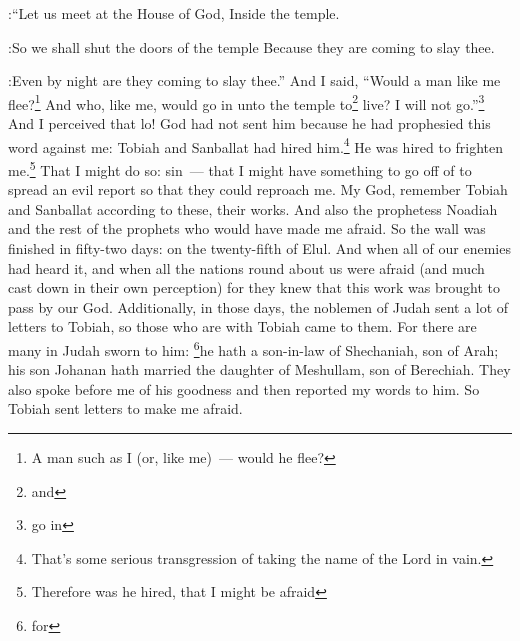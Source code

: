 \begin{enumerate}
:``Let us meet at the House of God, Inside the temple.

:So we shall shut the doors of the temple Because they are coming to slay thee.

:Even by night are they coming to slay thee.''%
     And I said, ``Would a man like me flee?\footnote{A man such as I (or, like me)~--- would he flee?} And who, like me, would go in unto the temple to\footnote{and} live? I will not go.''\footnote{go in}%
     And I perceived that lo! God had not sent him because he had prophesied this word against me: Tobiah and Sanballat had hired him.\footnote{That's some serious transgression of taking the name of the Lord in vain.}%
     He was hired to frighten me.\footnote{Therefore was he hired, that I might be afraid} That I might do so: sin~--- that I might have something to go off of to spread an evil report so that they could reproach me.%
     My God, remember Tobiah and Sanballat according to these, their works. And also the prophetess Noadiah and the rest of the prophets who would have made me afraid.%
     So the wall was finished in fifty-two days: on the twenty-fifth of Elul.%
     And when all of our enemies had heard it, and when all the nations round about us were afraid (and much cast down in their own perception) for they knew that this work was brought to pass by our God.%
     Additionally, in those days, the noblemen of Judah sent a lot of letters to Tobiah, so those who are with Tobiah came to them.%
     For there are many in Judah sworn to him: \footnote{for}he hath a son-in-law of Shechaniah, son of Arah; his son Johanan hath married the daughter of Meshullam, son of Berechiah.%
     They also spoke before me of his goodness and then reported my words to him. So Tobiah sent letters to make me afraid.%
\end{enumerate}
